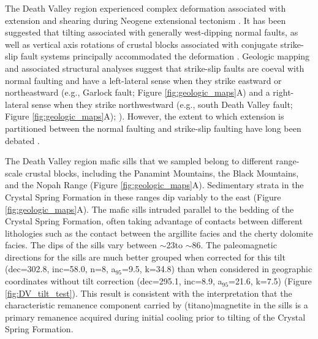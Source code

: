 The Death Valley region experienced complex deformation associated with extension and shearing during Neogene extensional tectonism \cite[e.g.][]{Wernicke1988a}. It has been suggested that tilting associated with generally west-dipping normal faults, as well as vertical axis rotations of crustal blocks associated with conjugate strike-slip fault systems principally accommodated the deformation \cite[e.g.][]{Serpa1996a}. Geologic mapping and associated structural analyses suggest that strike-slip faults are coeval with normal faulting and have a left-lateral sense when they strike eastward or northeastward (e.g., Garlock fault; Figure \ref{fig:geologic_maps}A) and a right-lateral sense when they strike northwestward (e.g., south Death Valley fault;  Figure \ref{fig:geologic_maps}A); \citealp{Wright1976a, Serpa1996a, Pavlis2014a}). However, the extent to which extension is partitioned between the normal faulting and strike-slip faulting have long been debated \cite[e.g.][]{Burchfiel1965a, Guth1981a, Snow1989a, Holm1993a, Petronis2002a, Renik2013a}. 

The Death Valley region mafic sills that we sampled belong to different range-scale crustal blocks, including the Panamint Mountains, the Black Mountains, and the Nopah Range (Figure \ref{fig:geologic_maps}A). Sedimentary strata in the Crystal Spring Formation in these ranges dip variably to the east (Figure \ref{fig:geologic_maps}A). The mafic sills intruded parallel to the bedding of the Crystal Spring Formation, often taking advantage of contacts between different lithologies such as the contact between the argillite facies and the cherty dolomite facies. The dips of the sills vary between $\sim$23\textdegree to $\sim$86\textdegree. The paleomagnetic directions for the sills are much better grouped when corrected for this tilt (dec=302.8\textdegree, inc=58.0\textdegree, n=8, a$_{95}$=9.5\textdegree, k=34.8) than when considered in geographic coordinates without tilt correction (dec=295.1\textdegree, inc=8.9\textdegree, a$_{95}$=21.6\textdegree, k=7.5) (Figure \ref{fig:DV_tilt_test}). This result is consistent with the interpretation that the characteristic remanence component carried by (titano)magnetite in the sills is a primary remanence acquired during initial cooling prior to tilting of the Crystal Spring Formation. 

